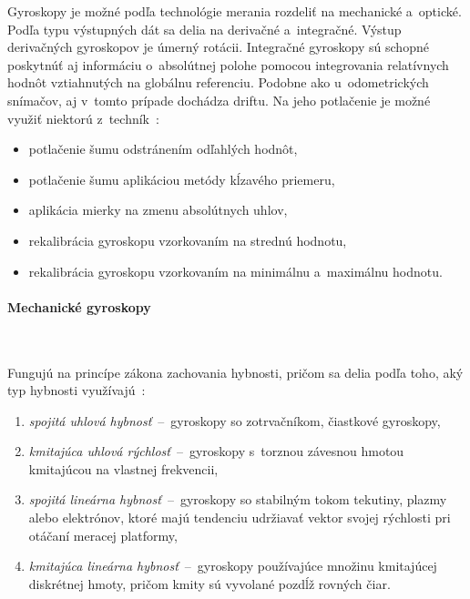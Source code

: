       Gyroskopy je možné podľa technológie merania rozdeliť na mechanické a~optické. Podľa typu výstupných dát sa delia na derivačné a~integračné. Výstup derivačných gyroskopov je úmerný rotácii. Integračné gyroskopy sú schopné poskytnúť aj informáciu o~absolútnej polohe pomocou integrovania relatívnych hodnôt vztiahnutých na globálnu referenciu. Podobne ako u~odometrických snímačov, aj v~tomto prípade dochádza driftu. Na jeho potlačenie je možné využiť niektorú z~techník~\cite{duchonSnimaceMobilnejRobotike2012}:
      \begin{itemize}
        \item potlačenie šumu odstránením odľahlých hodnôt,
        \item potlačenie šumu aplikáciou metódy kĺzavého priemeru,
        \item aplikácia mierky na zmenu absolútnych uhlov,
        \item rekalibrácia gyroskopu vzorkovaním na strednú hodnotu,
        \item rekalibrácia gyroskopu vzorkovaním na minimálnu a~maximálnu hodnotu.
      \end{itemize}

      \paragraph{Mechanické gyroskopy} \

        \noindent Fungujú na princípe zákona zachovania hybnosti, pričom sa delia podľa toho, aký typ hybnosti využívajú~\cite{duchonSnimaceMobilnejRobotike2012}:
        \begin{enumerate}
          \item \emph{spojitá uhlová hybnosť}~--~gyroskopy so zotrvačníkom, čiastkové gyroskopy,
          \item \emph{kmitajúca uhlová rýchlosť}~--~gyroskopy s~torznou závesnou hmotou kmitajúcou na vlastnej frekvencii,
          \item \emph{spojitá lineárna hybnosť}~--~gyroskopy so stabilným tokom tekutiny, plazmy alebo elektrónov, ktoré majú tendenciu udržiavať vektor svojej rýchlosti pri otáčaní meracej platformy,
          \item \emph{kmitajúca lineárna hybnosť}~--~gyroskopy používajúce množinu kmitajúcej diskrétnej hmoty, pričom kmity sú vyvolané pozdĺž rovných čiar.
        \end{enumerate}

